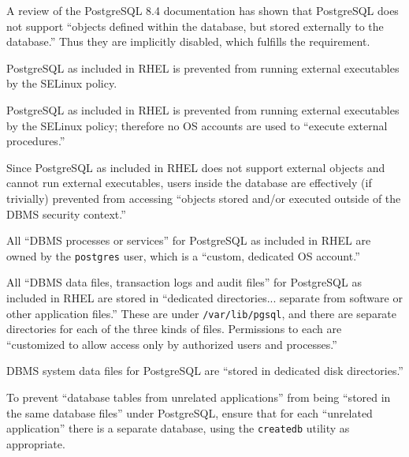 
%
A review of the PostgreSQL 8.4 documentation has shown that PostgreSQL
does not support ``objects defined within the database, but stored
externally to the database.'' Thus they are implicitly disabled, which
fulfills the requirement.

%
PostgreSQL as included in RHEL is prevented from running external
executables by the SELinux policy.

%
PostgreSQL as included in RHEL is prevented from running external
executables by the SELinux policy; therefore no OS accounts are used to
``execute external procedures.''

%
Since PostgreSQL as included in RHEL does not support external objects and
cannot run external executables, users inside the database are effectively
(if trivially) prevented from accessing ``objects stored and/or executed
outside of the DBMS security context.''

%
All ``DBMS processes or services'' for PostgreSQL as included in RHEL are
owned by the \verb!postgres! user, which is a ``custom, dedicated OS
account.''

%
All ``DBMS data files, transaction logs and audit files'' for PostgreSQL
as included in RHEL are stored in ``dedicated directories... separate from
software or other application files.'' These are under
\verb!/var/lib/pgsql!, and there are separate directories for each of the
three kinds of files. Permissions to each are ``customized to allow access only
by authorized users and processes.''

%
DBMS system data files for PostgreSQL are ``stored in dedicated disk
directories.''

%
To prevent ``database tables from unrelated applications'' from being
``stored in the same database files'' under PostgreSQL, ensure that for
each ``unrelated application'' there is a separate database, using the
\verb!createdb! utility as appropriate.

